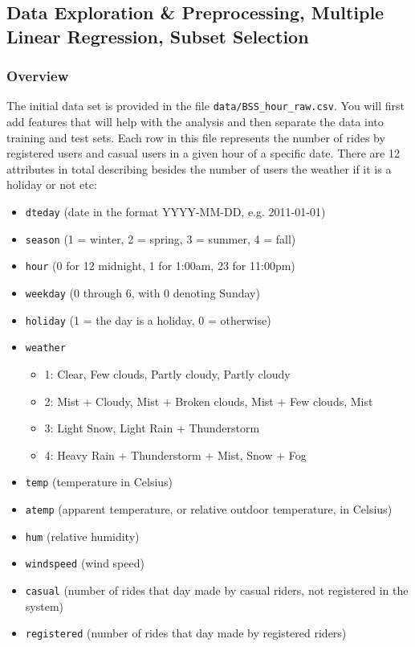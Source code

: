 \documentclass[11pt]{article}
\providecommand{\tightlist}{%
      \setlength{\itemsep}{0pt}\setlength{\parskip}{0pt}}
\begin{document}
    \subsection{Data Exploration \& Preprocessing, Multiple Linear
Regression, Subset
Selection}\label{data-exploration-preprocessing-multiple-linear-regression-subset-selection}

    \subsubsection{Overview}\label{overview}

The initial data set is provided in the file
\texttt{data/BSS\_hour\_raw.csv}. You will first add features that will
help with the analysis and then separate the data into training and test
sets. Each row in this file represents the number of rides by registered
users and casual users in a given hour of a specific date. There are 12
attributes in total describing besides the number of users the weather
if it is a holiday or not etc:

\begin{itemize}
\tightlist
\item
  \texttt{dteday} (date in the format YYYY-MM-DD, e.g. 2011-01-01)
\item
  \texttt{season} (1 = winter, 2 = spring, 3 = summer, 4 = fall)
\item
  \texttt{hour} (0 for 12 midnight, 1 for 1:00am, 23 for 11:00pm)
\item
  \texttt{weekday} (0 through 6, with 0 denoting Sunday)
\item
  \texttt{holiday} (1 = the day is a holiday, 0 = otherwise)
\item
  \texttt{weather}

  \begin{itemize}
  \tightlist
  \item
    1: Clear, Few clouds, Partly cloudy, Partly cloudy
  \item
    2: Mist + Cloudy, Mist + Broken clouds, Mist + Few clouds, Mist
  \item
    3: Light Snow, Light Rain + Thunderstorm
  \item
    4: Heavy Rain + Thunderstorm + Mist, Snow + Fog
  \end{itemize}
\item
  \texttt{temp} (temperature in Celsius)
\item
  \texttt{atemp} (apparent temperature, or relative outdoor temperature,
  in Celsius)
\item
  \texttt{hum} (relative humidity)
\item
  \texttt{windspeed} (wind speed)
\item
  \texttt{casual} (number of rides that day made by casual riders, not
  registered in the system)
\item
  \texttt{registered} (number of rides that day made by registered
  riders)
\end{itemize}
\end{document}
